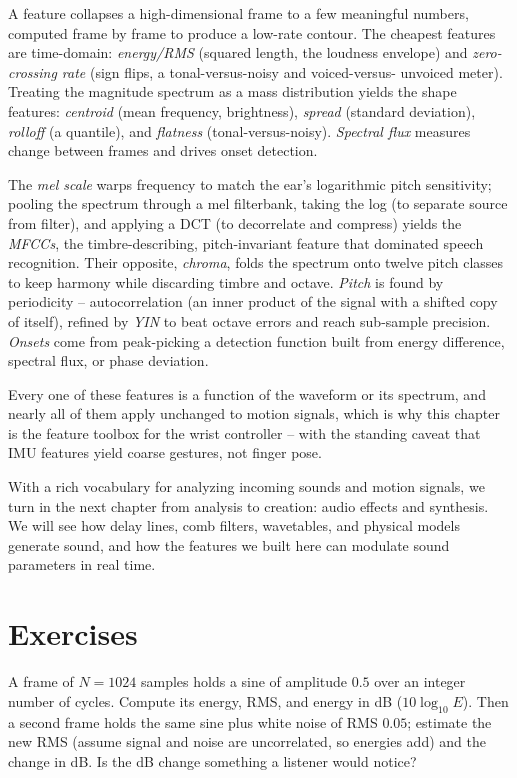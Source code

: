 A feature collapses a high-dimensional frame to a few meaningful numbers, computed
frame by frame to produce a low-rate contour. The cheapest features are
time-domain: \emph{energy/RMS} (squared length, the loudness envelope) and
\emph{zero-crossing rate} (sign flips, a tonal-versus-noisy and voiced-versus-
unvoiced meter). Treating the magnitude spectrum as a mass distribution yields the
shape features: \emph{centroid} (mean frequency, brightness), \emph{spread}
(standard deviation), \emph{rolloff} (a quantile), and \emph{flatness}
(tonal-versus-noisy). \emph{Spectral flux} measures change between frames and
drives onset detection.

The \emph{mel scale} warps frequency to match the ear's logarithmic pitch
sensitivity; pooling the spectrum through a mel filterbank, taking the log
(to separate source from filter), and applying a DCT (to decorrelate and compress)
yields the \emph{MFCCs}, the timbre-describing, pitch-invariant feature that
dominated speech recognition. Their opposite, \emph{chroma}, folds the spectrum
onto twelve pitch classes to keep harmony while discarding timbre and octave.
\emph{Pitch} is found by periodicity -- autocorrelation (an inner product of the
signal with a shifted copy of itself), refined by \emph{YIN} to beat octave errors
and reach sub-sample precision. \emph{Onsets} come from peak-picking a detection
function built from energy difference, spectral flux, or phase deviation.

Every one of these features is a function of the waveform or its spectrum, and
nearly all of them apply unchanged to motion signals, which is why this chapter is
the feature toolbox for the wrist controller -- with the standing caveat that IMU
features yield coarse gestures, not finger pose.

With a rich vocabulary for analyzing incoming sounds and motion signals, we turn
in the next chapter from analysis to creation: audio effects and synthesis. We will see
how delay lines, comb filters, wavetables, and physical models generate sound,
and how the features we built here can modulate sound parameters in real time.

\section{Exercises}
\label{ch27:exercises}

\begin{exercise}
\label{ch27:ex1}
A frame of $N=1024$ samples holds a sine of amplitude $0.5$ over an integer number
of cycles. Compute its energy, RMS, and energy in dB ($10\log_{10}E$). Then a
second frame holds the same sine plus white noise of RMS $0.05$; estimate the new
RMS (assume signal and noise are uncorrelated, so energies add) and the change in
dB. Is the dB change something a listener would notice?
\end{exercise}

